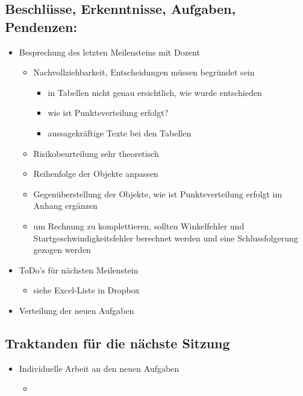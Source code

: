 \documentclass[a4paper,10pt,fleqn]{article}
\begin{document}
\subsection*{Beschlüsse, Erkenntnisse, Aufgaben, Pendenzen:}
\begin{itemize}
    \item Besprechung des letzten Meilensteins mit Dozent
    \begin{itemize}
    	\item Nachvollziehbarkeit, Entscheidungen müssen begründet sein
    	\begin{itemize}
    		\item in Tabellen nicht genau ersichtlich, wie wurde entschieden
    		\item wie ist Punkteverteilung erfolgt?
    		\item aussagekräftige Texte bei den Tabellen
    	\end{itemize}
    	\item Risikobeurteilung sehr theoretisch
    	\item Reihenfolge der Objekte anpassen 
    	\item Gegenüberstellung der Objekte, wie ist Punkteverteilung erfolgt im Anhang ergänzen
    	\item um Rechnung zu komplettieren, sollten Winkelfehler und Startgeschwindigkeitsfehler berechnet werden und eine Schlussfolgerung gezogen werden
    \end{itemize}
    \item ToDo's für nächsten Meilenstein
    \begin{itemize}
    	\item siehe Excel-Liste in Dropbox
    \end{itemize}
    \item Verteilung der neuen Aufgaben
\end{itemize}
%
\subsection*{Traktanden für die nächste Sitzung}
\begin{itemize}
    \item Individuelle Arbeit an den neuen Aufgaben
    \begin{itemize}
    	\item
	\end{itemize}
    
\end{itemize}
%
\end{document}
